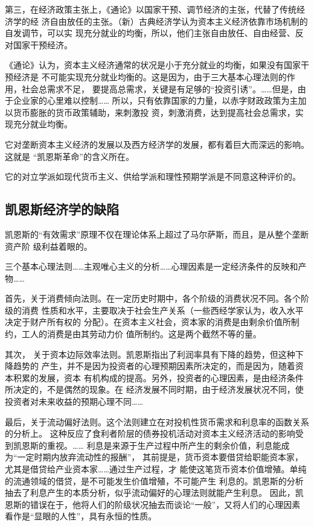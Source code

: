 第三，在经济政策主张上，《通论》以国家干预、调节经济的主张，代替了传统经济学的经
济自由放任的主张。（新）古典经济学认为资本主义经济依靠市场机制的自发调节，可以实
现充分就业的均衡，所以，他们主张自由放任、自由经营、反对国家干预经济。

《通论》认为，资本主义经济通常的状况是小于充分就业的均衡，如果没有国家干预经济是
不可能实现充分就业均衡的。这是因为，由于三大基本心理法则的作用，社会总需求不足，
要提高总需求，关键是有足够的“投资引诱”。……但是，由于企业家的心里难以控制……
所以，只有依靠国家的力量，以赤字财政政策为主加以货币膨胀的货币政策辅助，来刺激投
资，刺激消费，达到提高社会总需求，实现充分就业均衡。

它对垄断资本主义经济的发展以及西方经济学的发展，都有着巨大而深远的影响。这就是
“凯恩斯革命”的含义所在。

它的对立学派如现代货币主义、供给学派和理性预期学派是不同意这种评价的。

\subsection{凯恩斯经济学的缺陷}

凯恩斯的“有效需求”原理不仅在理论体系上超过了马尔萨斯，而且，是从整个垄断资产阶
级利益着眼的。

三个基本心理法则……主观唯心主义的分析……心理因素是一定经济条件的反映和产物……

首先，关于消费倾向法则。在一定历史时期中，各个阶级的消费状况不同。各个阶级的消费
性质和水平，主要取决于社会生产关系（一些西经学家认为，收入水平决定于财产所有权的
分配）。在资本主义社会，资本家的消费是由剩余价值所制约，工人的消费是由其劳动力价
值所制约。这是两个截然不等的量。

其次， 关于资本边际效率法则。凯恩斯指出了利润率具有下降的趋势，但这种下降趋势的
产生，并不是因为投资者的心理预期因素所决定的，而是因为，随着资本积累的发展，资本
有机构成的提高。另外，投资者的心理因素，是由经济条件所决定的，不是偶然的现象。在
经济发展不同时期，由于经济发展状况不同，使投资者对未来收益的预期心理不同……

最后，关于流动偏好法则。这个法则建立在对投机性货币需求和利息率的函数关系的分析上。
这种反应了食利者阶层的债券投机活动对资本主义经济活动的影响受到凯恩斯的重视。……
利息是来源于生产过程中所产生的剩余价值，利息能成为“一定时期内放弃流动性的报酬”，
其前提是，货币资本要借贷给职能资本家，尤其是借贷给产业资本家……通过生产过程，才
能使这笔货币资本价值增殖。单纯的流通领域的借贷，是不可能发生价值增殖，不可能产生
利息的。凯恩斯的分析抽去了利息产生的本质分析，似乎流动偏好的心理法则就能产生利息。
因此，凯恩斯的错误在于，他将人们的阶级状况抽去而谈论“一般”，又将人们的心理因素
看作是“显眼的人性”，具有永恒的性质。

